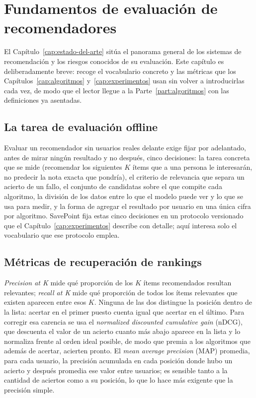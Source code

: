 \chapter{Fundamentos de evaluación de recomendadores}\label{cap:fundamentos}

El Capítulo~\ref{cap:estado-del-arte} sitúa el panorama general de los sistemas de
recomendación y los riesgos conocidos de su evaluación. Este capítulo es deliberadamente
breve: recoge el vocabulario concreto y las métricas que los Capítulos~\ref{cap:algoritmos}
y~\ref{cap:experimentos} usan sin volver a introducirlas cada vez, de modo que el lector llegue
a la Parte~\ref{part:algoritmos} con las definiciones ya asentadas.

\section{La tarea de evaluación offline}\label{sec:fundamentos-tarea}

Evaluar un recomendador sin usuarios reales delante exige fijar por adelantado, antes de mirar
ningún resultado y no después, cinco decisiones: la tarea concreta que se mide (recomendar los
siguientes $K$ ítems que a una persona le interesarán, no predecir la nota exacta que
pondría), el criterio de relevancia que separa un acierto de un fallo, el conjunto de
candidatas sobre el que compite cada algoritmo, la división de los datos entre lo que el modelo
puede ver y lo que se usa para medir, y la forma de agregar el resultado por usuario en una
única cifra por algoritmo. SavePoint fija estas cinco decisiones en un protocolo versionado
que el Capítulo~\ref{cap:experimentos} describe con detalle; aquí interesa solo el vocabulario
que ese protocolo emplea.

\section{Métricas de recuperación de rankings}\label{sec:fundamentos-metricas}

\textit{Precision at K} mide qué proporción de los $K$ ítems recomendados resultan relevantes;
\textit{recall at K} mide qué proporción de todos los ítems relevantes que existen aparecen
entre esos $K$. Ninguna de las dos distingue la posición dentro de la lista: acertar en el
primer puesto cuenta igual que acertar en el último. Para corregir esa carencia se usa el
\textit{normalized discounted cumulative gain} (nDCG), que descuenta el valor de un acierto
cuanto más abajo aparece en la lista y lo normaliza frente al orden ideal posible, de modo que
premia a los algoritmos que además de acertar, acierten pronto. El \textit{mean average
precision} (MAP) promedia, para cada usuario, la precisión acumulada en cada posición donde
hubo un acierto y después promedia ese valor entre usuarios; es sensible tanto a la cantidad
de aciertos como a su posición, lo que lo hace más exigente que la precisión simple.

